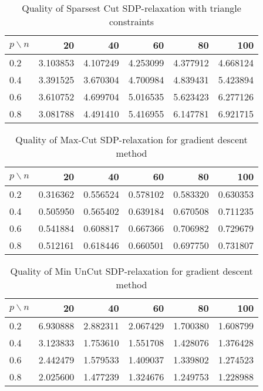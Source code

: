 \documentclass[12pt]{article}
\begin{document}
\begin{table}[H]
	\centering
	\begin{tabular}{|lrrrrr|}
		\toprule
		{$p \backslash n$} &       20  &       40  &       60  &       80  &       100 \\
		\midrule
		0.2 &  3.103853 &  4.107249 &  4.253099 &  4.377912 &  4.668124 \\
		0.4 &  3.391525 &  3.670304 &  4.700984 &  4.839431 &  5.423894 \\
		0.6 &  3.610752 &  4.699704 &  5.016535 &  5.623423 &  6.277126 \\
		0.8 &  3.081788 &  4.491410 &  5.416955 &  6.147781 &  6.921715 \\
		\bottomrule
	\end{tabular}\caption{Quality of Sparsest Cut SDP-relaxation with triangle 
		constraints}
\end{table}

\begin{table}[H]
	\centering
	\begin{tabular}{|lrrrrr|}
		\toprule
		{$p \backslash n$} &       20  &       40  &       60  &       80  &       100 \\
		\midrule
		0.2 &  0.316362 &  0.556524 &  0.578102 &  0.583320 &  0.630353 \\
		0.4 &  0.505950 &  0.565402 &  0.639184 &  0.670508 &  0.711235 \\
		0.6 &  0.541884 &  0.608817 &  0.667366 &  0.706982 &  0.729679 \\
		0.8 &  0.512161 &  0.618446 &  0.660501 &  0.697750 &  0.731807 \\
		\bottomrule
	\end{tabular}
	\caption{Quality of Max-Cut SDP-relaxation for gradient descent method}
\end{table}

\begin{table}[H]
	\centering
	\begin{tabular}{|lrrrrr|}
		\toprule
		{$p \backslash n$} &       20  &       40  &       60  &       80  &       100 \\
		\midrule
		0.2 &  6.930888 &  2.882311 &  2.067429 &  1.700380 &  1.608799 \\
		0.4 &  3.123833 &  1.753610 &  1.551708 &  1.428076 &  1.376428 \\
		0.6 &  2.442479 &  1.579533 &  1.409037 &  1.339802 &  1.274523 \\
		0.8 &  2.025600 &  1.477239 &  1.324676 &  1.249753 &  1.228988 \\
		\bottomrule
	\end{tabular}
	\caption{Quality of Min UnCut SDP-relaxation for gradient descent method}
\end{table}
\end{document}
